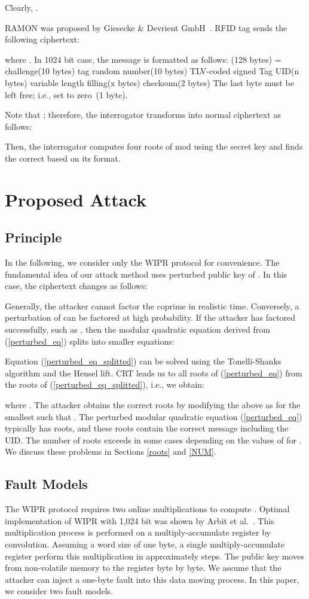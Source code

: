 \documentclass{article}
\begin{document}
Clearly, . 

RAMON was proposed by Giesecke \& Devrient GmbH~\cite{RAMON}.
RFID tag sends the following ciphertext:

where .
In 1024 bit  case, the message  is formatted as follows:
(128 bytes) = challenge(10 bytes)  tag random number(10 bytes)
  TLV-coded signed Tag UID(n bytes)  variable length filling(x bytes)  
checksum(2 bytes)  The last byte must be left free; i.e., set to zero~(1 byte).

Note that ; therefore, 
the interrogator transforms  into normal ciphertext as follows:

Then, the interrogator computes four roots of  mod  using the secret key  
and finds the correct  based on its format.


\section{Proposed Attack}

\subsection{Principle}
In the following, we consider only the WIPR protocol for convenience. 
The fundamental idea of our attack method uses perturbed public key  of .
In this case, the ciphertext changes as follows:

Generally, the attacker cannot factor the coprime  in realistic time.
Conversely, a perturbation  of  can be factored at high probability. 
If the attacker has factored  successfully, such as 
, 
then the modular quadratic equation 
 derived from (\ref{perturbed_eq}) splits into  smaller 
equations: 

Equation (\ref{perturbed_eq_splitted}) can be solved using the 
Tonelli-Shanks algorithm and the Hensel lift. 
CRT leads us to all roots of (\ref{perturbed_eq}) 
from the roots  of (\ref{perturbed_eq_splitted}), i.e., 
we obtain:

where . 
The attacker obtains the correct roots  by modifying the above  as  for 
the smallest  such that . 
The perturbed modular quadratic equation (\ref{perturbed_eq}) typically has  roots, and 
these roots contain the correct message including the UID.
The number of roots exceeds  in some cases depending 
on the values of  for . 
We discuss these problems in Sections \ref{roots} and \ref{NUM}.

\subsection{Fault Models}
The WIPR protocol requires two online multiplications to compute . 
Optimal implementation of WIPR with 1,024 bit  was shown by 
Arbit et al.~\cite{Implement}.
This multiplication process is performed on a multiply-accumulate register by convolution. 
Assuming a word size of one byte, a single multiply-accumulate register 
perform this multiplication in approximately  steps. 
The public key  moves from non-volatile memory to the register byte by byte. 
We assume that the attacker can inject a one-byte fault into this data moving process.
In this paper, we consider two fault models. 
\end{document}
